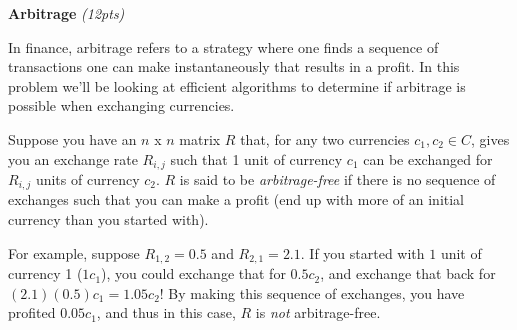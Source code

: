 \documentclass{exam}
\begin{document}
\begin{questions}

    \question \textbf{Arbitrage} \textit{(12pts)}
    
    In finance, arbitrage refers to a strategy where one finds a sequence of transactions one can make instantaneously that results in a profit. In this problem we'll be looking at efficient algorithms to determine if arbitrage is possible when exchanging currencies. 
    
    Suppose you have an $n$ x $n$ matrix $R$ that, for any two currencies $c_1, c_2 \in C$, gives you an exchange rate $R_{i, j}$ such that 1 unit of currency $c_1$ can be exchanged for $R_{i, j}$ units of currency $c_2$. $R$ is said to be \textit{arbitrage-free} if there is no sequence of exchanges such that you can make a profit (end up with more of an initial currency than you started with). 

    For example, suppose $R_{1,2} = 0.5$ and $R_{2,1} = 2.1$. If you started with $1$ unit of currency 1 ($1c_1$), you could exchange that for $0.5c_2$, and exchange that back for $(2.1)(0.5)c_1 = 1.05c_2$! By making this sequence of exchanges, you have profited $0.05c_1$, and thus in this case, $R$ is \textit{not} arbitrage-free.


\end{questions}
\end{document}

